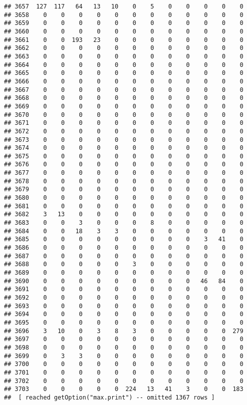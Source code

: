 \documentclass[]{article}
\begin{document}
\begin{verbatim}
## 3657  127  117   64   13   10    0    5    0    0    0    0    0
## 3658    0    0    0    0    0    0    0    0    0    0    0    0
## 3659    0    0    0    0    0    0    0    0    0    0    0    0
## 3660    0    0    0    0    0    0    0    0    0    0    0    0
## 3661    0    0  193   23    0    0    0    0    0    0    0    0
## 3662    0    0    0    0    0    0    0    0    0    0    0    0
## 3663    0    0    0    0    0    0    0    0    0    0    0    0
## 3664    0    0    0    0    0    0    0    0    0    0    0    0
## 3665    0    0    0    0    0    0    0    0    0    0    0    0
## 3666    0    0    0    0    0    0    0    0    0    0    0    0
## 3667    0    0    0    0    0    0    0    0    0    0    0    0
## 3668    0    0    0    0    0    0    0    0    0    0    0    0
## 3669    0    0    0    0    0    0    0    0    0    0    0    0
## 3670    0    0    0    0    0    0    0    0    0    0    0    0
## 3671    0    0    0    0    0    0    0    0    0    0    0    0
## 3672    0    0    0    0    0    0    0    0    0    0    0    0
## 3673    0    0    0    0    0    0    0    0    0    0    0    0
## 3674    0    0    0    0    0    0    0    0    0    0    0    0
## 3675    0    0    0    0    0    0    0    0    0    0    0    0
## 3676    0    0    0    0    0    0    0    0    0    0    0    0
## 3677    0    0    0    0    0    0    0    0    0    0    0    0
## 3678    0    0    0    0    0    0    0    0    0    0    0    0
## 3679    0    0    0    0    0    0    0    0    0    0    0    0
## 3680    0    0    0    0    0    0    0    0    0    0    0    0
## 3681    0    0    0    0    0    0    0    0    0    0    0    0
## 3682    3   13    0    0    0    0    0    0    0    0    0    0
## 3683    0    0    3    0    0    0    8    0    0    0    0    0
## 3684    0    0   18    3    3    0    0    0    0    0    0    0
## 3685    0    0    0    0    0    0    0    0    0    3   41    0
## 3686    0    0    0    0    0    0    0    0    0    0    0    0
## 3687    0    0    0    0    0    0    0    0    0    0    0    0
## 3688    0    0    0    0    0    3    0    0    0    0    0    0
## 3689    0    0    0    0    0    0    0    0    0    0    0    0
## 3690    0    0    0    0    0    0    0    0    0   46   84    0
## 3691    0    0    0    0    0    0    0    0    0    0    0    0
## 3692    0    0    0    0    0    0    0    0    0    0    0    0
## 3693    0    0    0    0    0    0    0    0    0    0    0    0
## 3694    0    0    0    0    0    0    0    0    0    0    0    0
## 3695    0    0    0    0    0    0    0    0    0    0    0    0
## 3696    3   10    0    3    8    3    0    0    0    0    0  279
## 3697    0    0    0    0    0    0    0    0    0    0    0    0
## 3698    0    0    0    0    0    0    0    0    0    0    0    0
## 3699    0    3    3    0    0    0    0    0    0    0    0    0
## 3700    0    0    0    0    0    0    0    0    0    0    0    0
## 3701    0    0    0    0    0    0    0    0    0    0    0    0
## 3702    0    0    0    0    0    0    0    0    0    0    0    0
## 3703    0    0    0    0    0  224   13   41    3    0    0  183
##  [ reached getOption("max.print") -- omitted 1367 rows ]
\end{verbatim}
\end{document}
